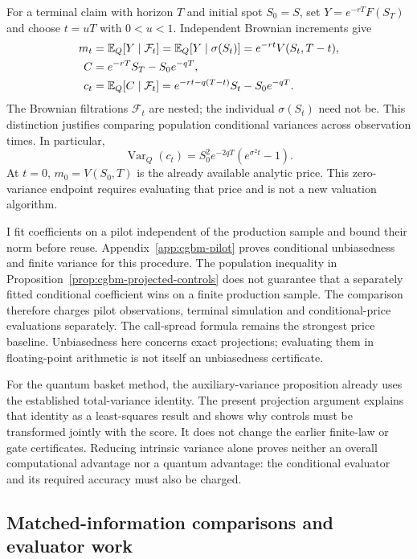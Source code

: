 \documentclass[11pt]{article}
\begin{document}
For a terminal claim with horizon $T$ and initial spot $S_0=S$, set
$Y=e^{-rT}F(S_T)$ and choose $t=uT$ with $0<u<1$. Independent Brownian
increments give
\begin{align}
 m_t&=\mathbb E_Q[Y\mid\mathcal F_t]
 =\mathbb E_Q[Y\mid\sigma(S_t)]
 =e^{-rt}V(S_t,T-t),\label{eq:cgbm-conditional-price}\\
 C&=e^{-rT}S_T-S_0e^{-qT},\notag\\
 c_t&=\mathbb E_Q[C\mid\mathcal F_t]
 =e^{-rt-q(T-t)}S_t-S_0e^{-qT}.
 \label{eq:cgbm-conditional-control}
\end{align}
The Brownian filtrations $\mathcal F_t$ are nested; the individual
$\sigma(S_t)$ need not be. This distinction justifies comparing
population conditional variances across observation times. In particular,
\begin{equation}
 \operatorname{Var}_Q(c_t)
 =S_0^2e^{-2qT}(e^{\sigma^2t}-1).
 \label{eq:cgbm-conditional-control-variance}
\end{equation}
At $t=0$, $m_0=V(S_0,T)$ is the already available analytic price.
This zero-variance endpoint requires evaluating that price and is not a
new valuation algorithm.

I fit coefficients on a pilot independent of the production sample and
bound their norm before reuse. Appendix~\ref{app:cgbm-pilot} proves
conditional unbiasedness and finite variance for this procedure. The
population inequality in Proposition~\ref{prop:cgbm-projected-controls}
does not guarantee that a separately fitted conditional coefficient wins
on a finite production sample. The comparison therefore charges pilot
observations, terminal simulation and conditional-price evaluations
separately. The call-spread formula remains the strongest price baseline.
Unbiasedness here concerns exact projections; evaluating them in
floating-point arithmetic is not itself an unbiasedness certificate.

For the quantum basket method, the auxiliary-variance proposition already
uses the established total-variance identity. The present projection
argument explains that identity as a least-squares result and shows why
controls must be transformed jointly with the score. It does not change
the earlier finite-law or gate certificates. Reducing intrinsic variance
alone proves neither an overall computational advantage nor a quantum
advantage: the conditional evaluator and its required accuracy must also
be charged.
\subsection{Matched-information comparisons and evaluator work}
\end{document}
